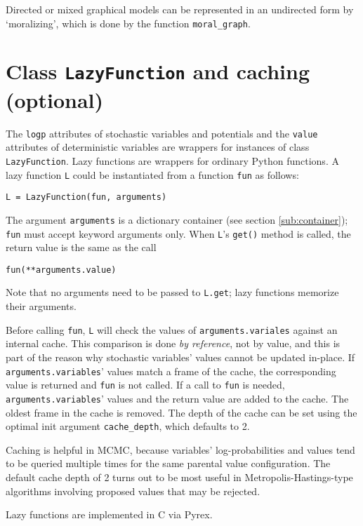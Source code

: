 Directed or mixed graphical models can be represented in an undirected form by `moralizing', which is done by the function \texttt{moral_graph}.

\section{Class \texttt{LazyFunction} and caching (optional)}
\label{sec:caching} 

The \texttt{logp} attributes of stochastic variables and potentials and the \texttt{value} attributes of deterministic variables are wrappers for instances of class \texttt{LazyFunction}. Lazy functions are wrappers for ordinary Python functions. A lazy function \texttt{L} could be instantiated from a function \texttt{fun} as follows:
\begin{verbatim}
L = LazyFunction(fun, arguments)
\end{verbatim}
The argument \texttt{arguments} is a dictionary container (see section \ref{sub:container}); \texttt{fun} must accept keyword arguments only. When \texttt{L}'s \texttt{get()} method is called, the return value is the same as the call 
\begin{verbatim}
fun(**arguments.value)
\end{verbatim}
Note that no arguments need to be passed to \texttt{L.get}; lazy functions memorize their arguments.

Before calling \texttt{fun}, \texttt{L} will check the values of \texttt{arguments.variales} against an internal cache. This comparison is done \emph{by reference}, not by value, and this is part of the reason why stochastic variables' values cannot be updated in-place. If \texttt{arguments.variables}' values match a frame of the cache, the corresponding value is returned and \texttt{fun} is not called. If a call to \texttt{fun} is needed, \texttt{arguments.variables}' values and the return value are added to the cache. The oldest frame in the cache is removed. The depth of the cache can be set using the optimal init argument \texttt{cache_depth}, which defaults to 2.

Caching is helpful in MCMC, because variables' log-probabilities and values tend to be queried multiple times for the same parental value configuration. The default cache depth of 2 turns out to be most useful in Metropolis-Hastings-type algorithms involving proposed values that may be rejected.

Lazy functions are implemented in C via Pyrex.